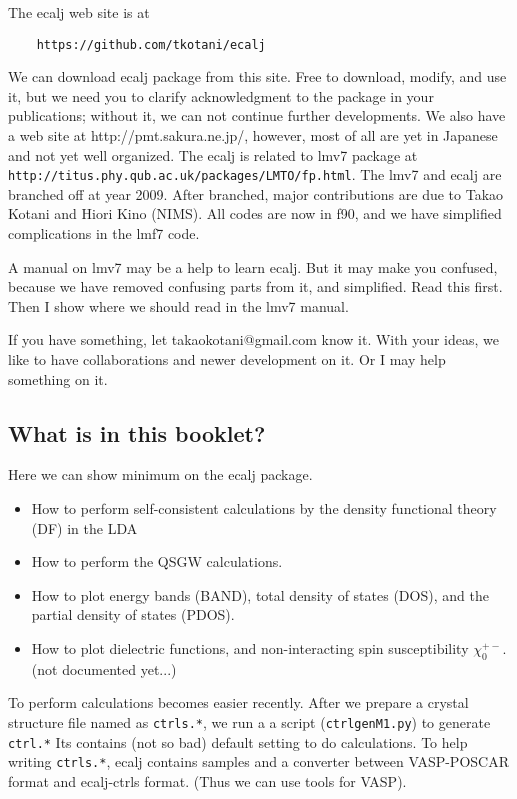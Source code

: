 \documentclass[a4paper,10pt,epsf,fleqn]{article}
\begin{document}
The ecalj web site is at 
\begin{verbatim}
    https://github.com/tkotani/ecalj
\end{verbatim}
We can download ecalj package from this site.
Free to download, modify, and use it, but we need you to clarify 
acknowledgment to the package in your publications; 
without it, we can not continue further developments.
We also have a web site at http://pmt.sakura.ne.jp/, 
however, most of all are yet in Japanese and not yet well organized.
The ecalj is related to lmv7 package at\\
\verb+http://titus.phy.qub.ac.uk/packages/LMTO/fp.html+. 
The lmv7 and ecalj are branched off at year 2009.
After branched, major contributions are due to Takao Kotani and Hiori
Kino (NIMS). All codes are now in f90, and we have simplified 
complications in the lmf7 code. 

A manual on lmv7 may be a help to learn ecalj. 
But it may make you confused, because we have removed confusing
parts from it, and simplified. Read this first. Then I show where we
should read in the lmv7 manual.

If you have something, let takaokotani@gmail.com know it.
With your ideas, we like to have collaborations and newer development on
it. Or I may help something on it.


\subsection{What is in this booklet?}
Here we can show minimum on the ecalj package.
\begin{itemize}
\item
How to perform self-consistent calculations by the density functional
theory (DF) in the LDA 
\item
How to perform the QSGW calculations.
\item
How to plot energy bands (BAND), total density of states
(DOS), and the partial density of states (PDOS).
\item
How to plot dielectric functions, and non-interacting spin
     susceptibility $\chi_0^{+-}$. (not documented yet...)
\end{itemize}

To perform calculations becomes easier recently.
After we prepare a crystal structure file named as \verb+ctrls.*+,
we run a a script (\verb+ctrlgenM1.py+) to generate \verb+ctrl.*+
Its contains (not so bad) default setting to do calculations.
To help writing \verb+ctrls.*+,  ecalj contains samples 
and a converter between VASP-POSCAR format and ecalj-ctrls format.
(Thus we can use tools for VASP).
\end{document}
